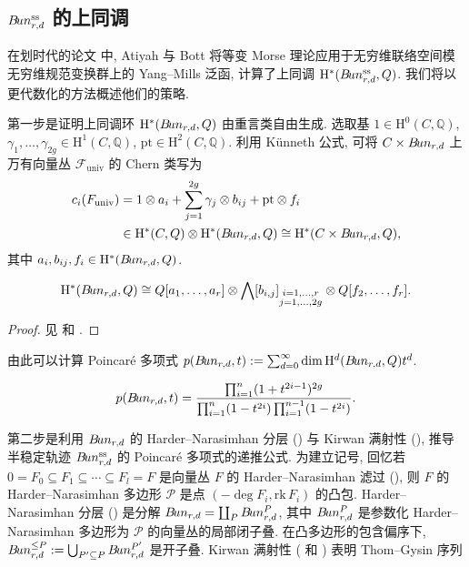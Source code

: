 \subsection{\texorpdfstring{$B\!un_{r,d}^{\mathrm{ss}}$ 的上同调}{半稳定向量丛叠的上同调}}\label{src:9.4.6-subsection}
在划时代的论文 \cite{AB83} 中, Atiyah 与 Bott 将等变 Morse 理论应用于无穷维联络空间模无穷维规范变换群上的 Yang--Mills 泛函, 计算了上同调 $\mathrm H^*(B\!un_{r,d}^{\mathrm{ss}},Q)$. 我们将以更代数化的方法概述他们的策略.

第一步是证明上同调环 $\mathrm H^*(B\!un_{r,d},Q)$ 由重言类自由生成. 选取基 $1\in\mathrm H^0(C,\mathbb Q)$, $\gamma_1,\ldots,\gamma_{2g}\in\mathrm H^1(C,\mathbb Q)$, $\mathrm{pt}\in\mathrm H^2(C,\mathbb Q)$. 利用 K\"unneth 公式, 可将 $C\times B\!un_{r,d}$ 上万有向量丛 $\mathcal F_{\mathrm{univ}}$ 的 Chern 类写为
\[
\begin{aligned}
c_i(F_{\mathrm{univ}})&=1\otimes a_i+\sum_{j=1}^{2g}\gamma_j\otimes b_{ij}+\mathrm{pt}\otimes f_i\\
&\in\mathrm H^*(C,Q)\otimes\mathrm H^*(B\!un_{r,d},Q)\cong\mathrm H^*(C\times B\!un_{r,d},Q),
\end{aligned}
\]
其中 $a_i,b_{ij},f_i\in\mathrm H^*(B\!un_{r,d},Q)$.
\begin{proposition}\label{src:9.4.46}
\[
\mathrm H^*(B\!un_{r,d},Q)\cong Q[a_1,\ldots,a_r]\otimes\bigwedge[b_{i,j}]_{\substack{i=1,\ldots,r\\j=1,\ldots,2g}}\otimes Q[f_2,\ldots,f_r].
\]
\end{proposition}
\begin{proof}
见 \cite[\S1--2]{AB83} 和 \cite[定理 4.7]{Hei10}.
\end{proof}
由此可以计算 Poincar\'e 多项式 $p(B\!un_{r,d},t):=\sum_{d=0}^{\infty}\dim\mathrm H^d(B\!un_{r,d},Q)t^d$.
\begin{corollary}\label{src:9.4.47}
\[
p(B\!un_{r,d},t)=\frac{\prod_{i=1}^{n}(1+t^{2i-1})^{2g}}{\prod_{i=1}^{n}(1-t^{2i})\prod_{i=1}^{n-1}(1-t^{2i})}.
\]
\end{corollary}
第二步是利用 $B\!un_{r,d}$ 的 Harder--Narasimhan 分层 () 与 Kirwan 满射性 (), 推导半稳定轨迹 $B\!un_{r,d}^{\mathrm{ss}}$ 的 Poincar\'e 多项式的递推公式. 为建立记号, 回忆若 $0=F_0\subseteq F_1\subseteq\cdots\subseteq F_l=F$ 是向量丛 $F$ 的 Harder--Narasimhan 滤过 (), 则 $F$ 的 Harder--Narasimhan 多边形 $\mathcal P$ 是点 $(-\deg F_i,\mathrm{rk}\,F_i)$ 的凸包. Harder--Narasimhan 分层 () 是分解 $B\!un_{r,d}=\coprod_{P}B\!un_{r,d}^{P}$, 其中 $B\!un_{r,d}^{P}$ 是参数化 Harder--Narasimhan 多边形为 $\mathcal P$ 的向量丛的局部闭子叠. 在凸多边形的包含偏序下, $B\!un_{r,d}^{\leq P}:=\bigcup_{P'\subseteq P}B\!un_{r,d}^{P'}$ 是开子叠. Kirwan 满射性 ( 和 ) 表明 Thom--Gysin 序列
